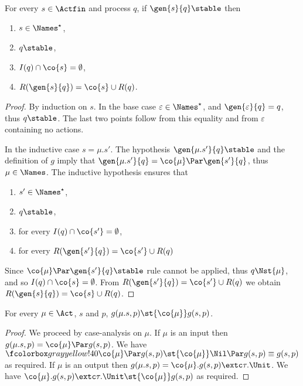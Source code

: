 \begin{lemma}
  \label{lem:gs-stable}
  For every $s \in \Actfin$ and process $q$, if $\gen{s}{q} \stable$ then
  \begin{enumerate}
  \item $ s \in \Names^\star $,
  \item $ q \stable $,
  \item $I(q) \cap \co{s} = \emptyset $,
  \item $R(\gen{s}{q}) = \co{s} \cup R(q)$.
  \end{enumerate}
\end{lemma}
\begin{proof}
  By induction on $s$.
  In the base case $\varepsilon \in \Names^\star$,
  and $\gen{ \varepsilon }{q} = q$,
  thus $q \stable$. The last two points follow from
  this equality and from $\varepsilon$ containing no actions.

  In the inductive case $s = \mu . s'$.
  The hypothesis $\gen{\mu . s'}{q} \stable$ and the definition
  of $g$ imply that $\gen{\mu . s'}{q} = \co{\mu} \Par \gen{s'}{q}$,
  thus $\mu \in \Names$. The inductive hypothesis ensures that
  \begin{enumerate}
  \item $ s' \in \Names^\star $,
  \item $ q \stable $,
  \item for every $I(q) \cap \co{s'} = \emptyset $,
  \item for every $R(\gen{s'}{q}) = \co{s'} \cup R(q)$
  \end{enumerate}
  Since $ \co{\mu} \Par \gen{s'}{q} \stable $ rule \com
  cannot be applied, thus $ q \Nst{\mu} $, and so
  $I(q) \cap \co{s} = \emptyset $.
  From $R(\gen{s'}{q}) = \co{s'} \cup R(q)$ we obtain
  $R(\gen{s}{q}) = \co{s} \cup R(q)$.
\end{proof}

\begin{lemma}%
  \label{lem:gen-test-lts-co-mu}
  For every $\mu \in \Act$, $s$ and $p$, $g(\mu.s, p) \st{\co{\mu}} g(s,p)$.
\end{lemma}
\begin{proof}
We proceed by case-analysis on $\mu$.
If $\mu$ is an input then $g(\mu.s, p) = \co{\mu} \Par g(s, p)$.
We have $\mailbox{ \co{\mu} } \Par g(s, p) \st{\co{\mu}} \Nil \Par g(s, p) \equiv g(s, p)$
as required.
If $\mu$ is an output then $g(\mu.s, p) = \co{\mu}.g(s, p) \extc \tau.\Unit$.
We have $\co{\mu}.g(s, p) \extc \tau.\Unit \st{\co{\mu}} g(s, p)$ as required.
\end{proof}





